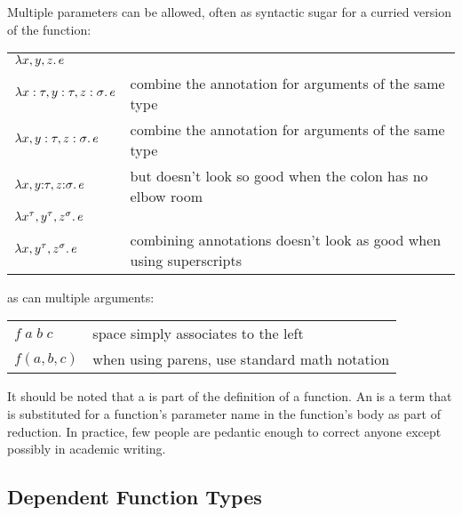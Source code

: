 \documentclass[11pt]{article} %
\theoremstyle{definition}
\theoremstyle{remark}
\begin{document}
Multiple parameters can be allowed, often as syntactic sugar for a curried version of the function:
\begin{center}
\renewcommand{\arraystretch}{1.2}
\begin{tabular}{lp{10cm}}
${\lambda}{x,y,z}.\,e$ \\
${\lambda}{x:\tau,y:\tau,z:\sigma}.\,e$ & combine the annotation for arguments of the same type \\
${\lambda}{x,y:\tau,z:\sigma}.\,e$ & combine the annotation for arguments of the same type \\
${\lambda}{x,y\mathord:\tau,z\mathord:\sigma}.\,e$ & but doesn't look so good when the colon has no elbow room \\
${\lambda}{x^\tau,y^\tau,z^\sigma}.\,e$ \\
${\lambda}{x,y^\tau,z^\sigma}.\,e$ & combining annotations doesn't look as good when using superscripts \\
\end{tabular}
\end{center}
as can multiple arguments:
\begin{center}
\renewcommand{\arraystretch}{1.2}
\begin{tabular}{lp{10cm}}
$f\;a\;b\;c$ & space simply associates to the left \\
$f(a, b, c)$ & when using parens, use standard math notation \\
\end{tabular}
\end{center}

It should be noted that a  is part of the definition of a function.
An  is a term that is substituted for a function's parameter name in the function's body as part of reduction.
In practice, few people are pedantic enough to correct anyone except possibly in academic writing.


\subsection{Dependent Function Types}
\end{document}
